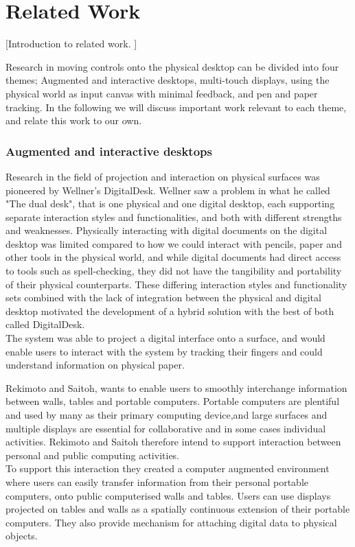 \chapter{Related Work} %
\label{cha:related_work}
[Introduction to related work. ]

Research in moving controls onto the physical desktop can be divided into four themes; Augmented and interactive desktops, multi-touch displays, using the physical world as input canvas with minimal feedback, and pen and paper tracking. In the following we will discuss important work relevant to each theme, and relate this work to our own. 

\subsection{Augmented and interactive desktops} %
\label{sub:aug}

Research in the field of projection and interaction on physical surfaces was pioneered by Wellner’s DigitalDesk\cite{wellner1993interacting}. Wellner saw a problem in what he called "The dual desk", that is one physical and one digital desktop, each supporting separate interaction styles and functionalities, and both with different strengths and weaknesses. Physically interacting with digital documents on the digital desktop was limited compared to how we could interact with pencils, paper and other tools in the physical world, and while digital documents had direct access to tools such as spell-checking, they did not have the tangibility and portability of their physical counterparts. These differing interaction styles and functionality sets combined with the lack of integration between the physical and digital desktop motivated the development of a hybrid solution with the best of both called DigitalDesk.\\
The system was able to project a digital interface onto a surface, and would enable users to interact with the system by tracking their fingers and could understand information on physical paper.

Rekimoto and Saitoh\cite{rekimoto1999augmented}, wants to enable users to smoothly interchange information between walls, tables and portable computers. Portable computers are plentiful and used by many as their primary computing device,and large surfaces and multiple displays are essential for collaborative and in some cases individual activities. Rekimoto and Saitoh therefore intend to support interaction between personal and public computing activities. \\
To support this interaction they created a computer augmented environment where users can easily transfer information from their personal portable computers, onto public computerised walls and tables. Users can use displays projected on tables and walls as a spatially continuous extension of their portable computers. They also provide mechanism for attaching digital data to physical objects.


